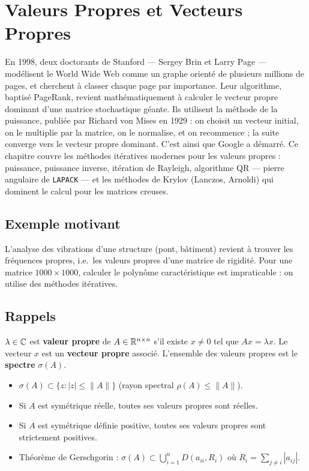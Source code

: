 \chapter{Valeurs Propres et Vecteurs Propres}
\label{ch:vp}

En 1998, deux doctorants de Stanford --- Sergey Brin et Larry Page --- modélisent le World Wide Web comme un graphe orienté de plusieurs millions de pages, et cherchent à classer chaque page par importance. Leur algorithme, baptisé PageRank, revient mathématiquement à calculer le vecteur propre dominant d'une matrice stochastique géante. Ils utilisent la méthode de la puissance, publiée par Richard von Mises en 1929 : on choisit un vecteur initial, on le multiplie par la matrice, on le normalise, et on recommence ; la suite converge vers le vecteur propre dominant. C'est ainsi que Google a démarré. Ce chapitre couvre les méthodes itératives modernes pour les valeurs propres : puissance, puissance inverse, itération de Rayleigh, algorithme QR --- pierre angulaire de \texttt{LAPACK} --- et les méthodes de Krylov (Lanczos, Arnoldi) qui dominent le calcul pour les matrices creuses.

\section{Exemple motivant}
L'analyse des vibrations d'une structure (pont, b\^atiment) revient \`a trouver les fr\'equences propres, i.e.\ les valeurs propres d'une matrice de rigidit\'e. Pour une matrice $1000\times 1000$, calculer le polyn\^ome caract\'eristique est impraticable : on utilise des m\'ethodes it\'eratives.

\section{Rappels}

\begin{definition}
$\lambda\in\mathbb{C}$ est \textbf{valeur propre} de $A\in\mathbb{R}^{n\times n}$ s'il existe $x\neq 0$ tel que $Ax=\lambda x$. Le vecteur $x$ est un \textbf{vecteur propre} associ\'e. L'ensemble des valeurs propres est le \textbf{spectre} $\sigma(A)$.
\end{definition}

\begin{theoreme}
\begin{itemize}
\item $\sigma(A)\subset\{z : |z|\leq\|A\|\}$ (rayon spectral $\rho(A)\leq\|A\|$).
\item Si $A$ est sym\'etrique r\'eelle, toutes ses valeurs propres sont r\'eelles.
\item Si $A$ est sym\'etrique d\'efinie positive, toutes ses valeurs propres sont strictement positives.
\item Th\'eor\`eme de Gerschgorin : $\sigma(A)\subset\bigcup_{i=1}^n D(a_{ii},R_i)$ o\`u $R_i=\sum_{j\neq i}|a_{ij}|$.
\end{itemize}
\end{theoreme}

